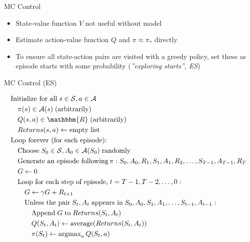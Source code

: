 \documentclass[ignorenonframetext,xcolor=x11names]{beamer}
\begin{document}
\begin{frame}{MC Control}
\begin{itemize}
   \item State-value function $V$ not useful without model
   \item Estimate action-value function $Q$ and $\pi \approx \pi_*$ directly
   \item To ensure all state-action pairs are visited with a greedy policy, set these as episode starts with some probability (\emph{''exploring starts'', ES})
\end{itemize}
\end{frame}

\begin{frame}{MC Control (ES)}
\begin{block}{}
\footnotesize
\begin{align*}
& \text{Initialize for all}\; s \in \mathcal{S}, a \in \mathcal{A} \\
& \quad \pi(s) \in \mathcal{A}(s) \; \text{(arbitrarily)} \\
& \quad Q(s,a) \in \mathbbm{R}\; \text{(arbitrarily)} \\
& \quad Returns(s, a) \leftarrow \text{empty list} \\
& \text{Loop forever (for each episode):} \\
& \quad \text{Choose}\; S_0 \in \mathcal{S}, A_0 \in \mathcal{A}(S_0)\; \text{randomly} \\
& \quad \text{Generate an episode following}\, \pi: S_0, A_0, R_1, S_1, A_1, R_2, \ldots, S_{T-1}, A_{T-1}, R_{T} \\
& \quad G \leftarrow 0 \\
& \quad \text{Loop for each step of episode,}\; t = T-1, T-2, \ldots, 0: \\
& \quad \quad G \leftarrow \gamma G + R_{t+1} \\
& \quad \quad \text{Unless the pair}\; S_t, A_t \; \text{appears in}\; S_0, A_0, S_1, A_1, \ldots, S_{t-1}, A_{t-1}: \\
& \quad \quad \quad \text{Append}\; G\; \text{to}\; Returns(S_t, A_t) \\
& \quad \quad \quad Q(S_t, A_t) \leftarrow \operatorname{average}(Returns(S_t, A_t)) \\
& \quad \quad \quad \pi(S_t) \leftarrow \operatorname{arg max}_a Q(S_t, a)
\end{align*}
\end{block}
\end{frame}
\end{document}
